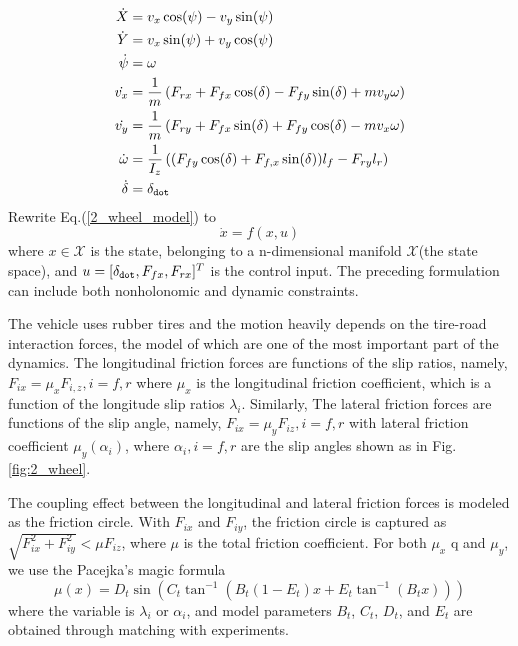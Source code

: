 \documentclass[conference, onecolumn]{IEEEtran}
\begin{document}
\begin{subequations}\label{2_wheel_model}
	\begin{align}
	\dot{X}  & = v_x \cos(\psi)-v_y \sin(\psi)\\
	\dot{Y} & = v_x \sin(\psi)+v_y \cos(\psi) \\
	\dot{\psi} & = \omega \\
	\dot{v_x} & = \frac{1}{m}\left(F_{rx}+F_{fx}\cos(\delta)-F_{fy}\sin(\delta)+mv_y\omega\right)\\
	\dot{v_y} & = \frac{1}{m}\left(F_{ry}+F_{fx}\sin(\delta)+F_{fy}\cos(\delta)-mv_x\omega\right)\\
	\dot{\omega} & = \frac{1}{I_z}\left((F_{fy}\cos(\delta)+F_{f,x}\sin(\delta))l_f-F_{ry}l_r\right) \\
	\dot{\delta} & = \delta_{\tt dot}
	\end{align}
\end{subequations}
Rewrite Eq.(\ref{2_wheel_model}) to
\begin{equation}
	\dot{x} = f(x,u)
\end{equation}
where $x \in \mathcal{X}$ is the state, belonging to a n-dimensional manifold $\mathcal{X}$(the state space), and $u=[\delta_{\tt dot},F_{fx},F_{rx}]^T$ is the control input. The preceding formulation can include both nonholonomic and dynamic constraints. 

The vehicle uses rubber tires and the motion heavily depends on the tire-road interaction forces, the model of which are one of the most important part of the dynamics. The longitudinal friction forces are functions of the slip ratios, namely, $F_{ix} = \mu_x F_{i,z},i=f,r$ where $\mu_x$ is the longitudinal friction coefficient, which is a function of the longitude slip ratios $\lambda_i$. Similarly, The lateral friction forces are functions of the slip angle, namely, $F_{ix} = \mu_y F_{iz},i=f,r$ with lateral friction coefficient $\mu_y(\alpha_i)$, where $\alpha_i,i=f,r$ are the slip angles shown as in Fig.\ref{fig:2_wheel}.

The coupling effect between the longitudinal and lateral
friction forces is modeled as the friction circle. With $F_{ix}$ and $F_{iy}$, the friction circle is captured as $\sqrt{F_{ix}^2+F_{iy}^2}  < \mu F_{iz}$, where $\mu$ is the total friction coefficient. For both $\mu_x$ q and $\mu_y$, we use the Pacejka’s magic formula\cite{pacejka2012tire}
\begin{equation}\label{magicformula}	
	\mu(x)=D_t\sin\left(C_t\tan^{-1}\left(B_t(1-E_t)x+E_t\tan^{-1}(B_tx)\right)\right)
\end{equation}
where the variable is $\lambda_i$ or $\alpha_i$, and model parameters $B_t$, $C_t$, $D_t$, and $E_t$ are obtained through matching with experiments.
\end{document}
